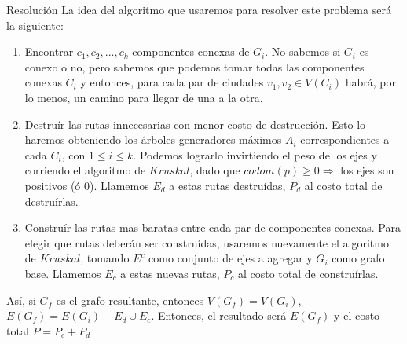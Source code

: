 \documentclass[a4paper]{article}
\begin{document}
\begin{subsection}{Resoluci\'{o}n}
La idea del algoritmo que usaremos para resolver este problema ser\'{a} la siguiente:
\begin{enumerate}
	\item{Encontrar $c_1, c_2, ... , c_k$ componentes conexas de $G_i$. No sabemos si $G_i$ es conexo o no, pero sabemos que podemos tomar todas las componentes conexas $C_i$ y entonces, para cada par de ciudades $v_1, v_2 \in V(C_i)$ habr\'{a}, por lo menos, un camino para llegar de una a la otra.}
    \item{Destru\'{i}r las rutas innecesarias con menor costo de destrucci\'{o}n. Esto lo haremos obteniendo los \'{a}rboles generadores m\'{a}ximos $A_i$ correspondientes a cada $C_i$, con $1 \leq i \leq k$. Podemos lograrlo invirtiendo el peso de los ejes y corriendo el algoritmo de $Kruskal$, dado que $codom(p) \geq 0 \Rightarrow$ los ejes son positivos (\'{o} 0). Llamemos $E_d$ a estas rutas destru\'{i}das, $P_d$ al costo total de destru\'{i}rlas.}
    \item{Constru\'{i}r las rutas mas baratas entre cada par de componentes conexas. Para elegir que rutas deber\'{a}n ser constru\'{i}das, usaremos nuevamente el algoritmo de $Kruskal$, tomando $E^c$ como conjunto de ejes a agregar y $G_i$ como grafo base. Llamemos $E_c$ a estas nuevas rutas, $P_c$ al costo total de constru\'{i}rlas.}
\end{enumerate}
As\'{i}, si $G_f$ es el grafo resultante, entonces $V(G_f) = V(G_i)$, $E(G_f) = E(G_i) - E_d \cup E_c$. Entonces, el resultado ser\'{a} $E(G_f)$ y el costo total $P = P_c + P_d$
\end{subsection}
\end{document}
